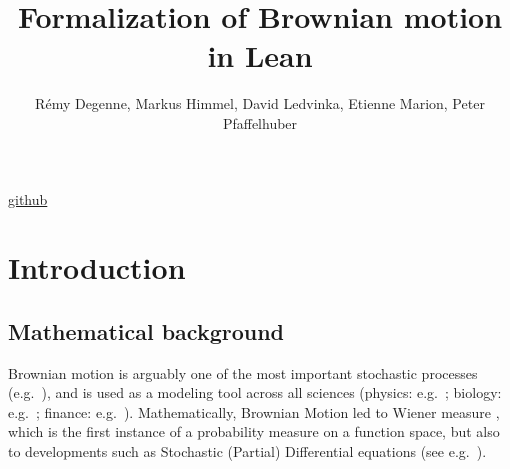 \documentclass[lean]{Draft}
\title[Formalization of Brownian motion in Lean]{Formalization of Brownian motion in Lean}
\author[R. Degenne, M. Himmel, D. Ledvinka, E. Marion, P. Pfaffelhuber]{
  Rémy Degenne, Markus Himmel, David Ledvinka, Etienne Marion, Peter Pfaffelhuber}
\makeatletter
\newcommand\leanlink{\begingroup\catcode`\#=12\relax\@leanlink}
\newcommand\@leanlink[2]{\endgroup
\href{#1}
{\texttt{\detokenize{#2}}}}
\makeatother
\begin{document}
\href{https://github.com/RemyDegenne/brownian-motion}{github}




\section{Introduction}

\subsection{Mathematical background}
\sloppy Brownian motion is arguably one of the most important stochastic processes (e.g.\ \cite{karatzas1991brownian, morters2010brownian}), and is used as a modeling tool across all sciences (physics: e.g.\ \cite{einstein1906theorie, bian2016111}; biology: e.g.\ \cite{erban2014molecular}; finance: e.g.\ \cite{davis2006louis}). Mathematically, Brownian Motion led to Wiener measure \cite{wiener1923differential}, which is the first instance of a probability measure on a function space, but also to developments such as Stochastic (Partial) Differential equations (see e.g.\ \cite{hairer2009introduction}).
\end{document}
